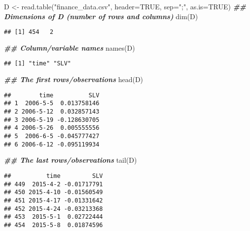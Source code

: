 \documentclass[
]{article}
\newenvironment{Shaded}{\begin{snugshade}}{\end{snugshade}}
\newcommand{\AttributeTok}[1]{\textcolor[rgb]{0.77,0.63,0.00}{#1}}
\newcommand{\ConstantTok}[1]{\textcolor[rgb]{0.00,0.00,0.00}{#1}}
\newcommand{\DocumentationTok}[1]{\textcolor[rgb]{0.56,0.35,0.01}{\textbf{\textit{#1}}}}
\newcommand{\FunctionTok}[1]{\textcolor[rgb]{0.00,0.00,0.00}{#1}}
\newcommand{\NormalTok}[1]{#1}
\newcommand{\OtherTok}[1]{\textcolor[rgb]{0.56,0.35,0.01}{#1}}
\newcommand{\StringTok}[1]{\textcolor[rgb]{0.31,0.60,0.02}{#1}}
\begin{document}
\begin{Shaded}
\begin{Highlighting}[]
\NormalTok{D }\OtherTok{\textless{}{-}} \FunctionTok{read.table}\NormalTok{(}\StringTok{"finance\_data.csv"}\NormalTok{, }\AttributeTok{header=}\ConstantTok{TRUE}\NormalTok{, }\AttributeTok{sep=}\StringTok{";"}\NormalTok{, }
                \AttributeTok{as.is=}\ConstantTok{TRUE}\NormalTok{)}
\DocumentationTok{\#\# Dimensions of D (number of rows and columns)}
\FunctionTok{dim}\NormalTok{(D)}
\end{Highlighting}
\end{Shaded}

\begin{verbatim}
## [1] 454   2
\end{verbatim}

\begin{Shaded}
\begin{Highlighting}[]
\DocumentationTok{\#\#  Column/variable names}
\FunctionTok{names}\NormalTok{(D)}
\end{Highlighting}
\end{Shaded}

\begin{verbatim}
## [1] "time" "SLV"
\end{verbatim}

\begin{Shaded}
\begin{Highlighting}[]
\DocumentationTok{\#\# The first rows/observations}
\FunctionTok{head}\NormalTok{(D)}
\end{Highlighting}
\end{Shaded}

\begin{verbatim}
##        time          SLV
## 1  2006-5-5  0.013758146
## 2 2006-5-12  0.032857143
## 3 2006-5-19 -0.128630705
## 4 2006-5-26  0.005555556
## 5  2006-6-5 -0.045777427
## 6 2006-6-12 -0.095119934
\end{verbatim}

\begin{Shaded}
\begin{Highlighting}[]
\DocumentationTok{\#\# The last rows/observations}
\FunctionTok{tail}\NormalTok{(D)}
\end{Highlighting}
\end{Shaded}

\begin{verbatim}
##          time         SLV
## 449  2015-4-2 -0.01717791
## 450 2015-4-10 -0.01560549
## 451 2015-4-17 -0.01331642
## 452 2015-4-24 -0.03213368
## 453  2015-5-1  0.02722444
## 454  2015-5-8  0.01874596
\end{verbatim}
\end{document}

